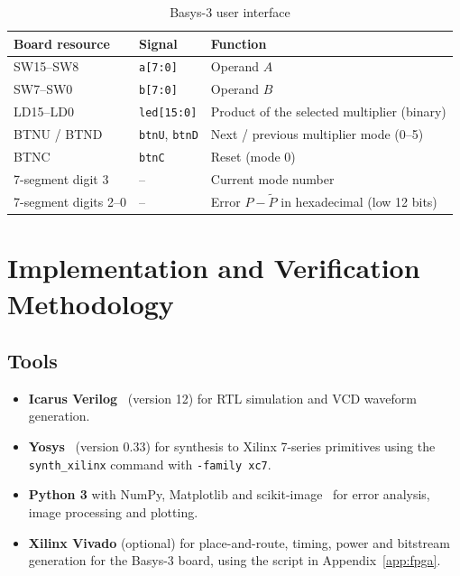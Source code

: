 \documentclass[12pt,a4paper,oneside]{report}
\begin{document}
\begin{table}[ht]
\centering
\caption{Basys-3 user interface}
\label{tab:io}
\begin{tabular}{lll}
\toprule
Board resource & Signal & Function \\
\midrule
SW15--SW8 & \texttt{a[7:0]} & Operand $A$ \\
SW7--SW0  & \texttt{b[7:0]} & Operand $B$ \\
LD15--LD0 & \texttt{led[15:0]} & Product of the selected multiplier (binary) \\
BTNU / BTND & \texttt{btnU}, \texttt{btnD} & Next / previous multiplier mode (0--5) \\
BTNC & \texttt{btnC} & Reset (mode 0) \\
7-segment digit 3 & -- & Current mode number \\
7-segment digits 2--0 & -- & Error $P-\tilde{P}$ in hexadecimal (low 12 bits) \\
\bottomrule
\end{tabular}
\end{table}

\chapter{Implementation and Verification Methodology}

\section{Tools}
\begin{itemize}
\item \textbf{Icarus Verilog}~\cite{iverilog} (version 12) for RTL simulation and VCD waveform generation.
\item \textbf{Yosys}~\cite{yosys} (version 0.33) for synthesis to Xilinx 7-series primitives using the \texttt{synth\_xilinx} command with \texttt{-family xc7}.
\item \textbf{Python 3} with NumPy, Matplotlib and scikit-image~\cite{vanderwalt2014skimage} for error analysis, image processing and plotting.
\item \textbf{Xilinx Vivado} (optional) for place-and-route, timing, power and bitstream generation for the Basys-3 board, using the script in Appendix~\ref{app:fpga}.
\end{itemize}
\end{document}
